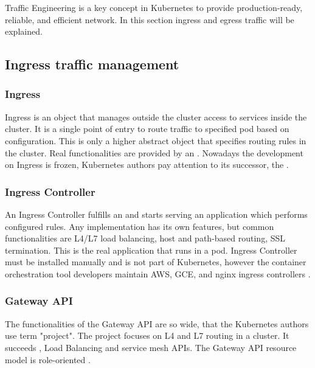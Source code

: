 Traffic Engineering is a key concept in Kubernetes to provide production-ready, reliable, and efficient network. In this section ingress and egress traffic will be explained.


\subsection{Ingress traffic management}
\label{sec:ingressTrafficMngmnt}

\subsubsection{Ingress}
\label{ingress}

Ingress is an object that manages outside the cluster access to services inside the cluster. It is a single point of entry to route traffic to specified pod based on configuration. This is only a higher abstract object that specifies routing rules in the cluster. Real functionalities are provided by an \textit{}. Nowadays the development on Ingress is frozen, Kubernetes authors pay attention to its successor, the \textit{} \cite{KubernetesDocs}.

\subsubsection{Ingress Controller}
\label{ingresscontroller}

An Ingress Controller fulfills an \textit{} and starts serving an application which performs configured rules. Any implementation has its own features, but common functionalities are L4/L7 load balancing, host and path-based routing, SSL termination. This is the real application that runs in a pod. Ingress Controller must be installed manually and is not part of Kubernetes, however the container orchestration tool developers maintain AWS, GCE, and nginx ingress controllers \cite{KubernetesDocs}. 


\subsubsection{Gateway API}
\label{gatewayapi}

The functionalities of the Gateway API are so wide, that the Kubernetes authors use term "project". The project focuses on L4 and L7 routing in a cluster. It succeeds \textit{}, Load Balancing and service mesh APIs. The Gateway API resource model is role-oriented \cite{KubernetesGatewayAPI}.

